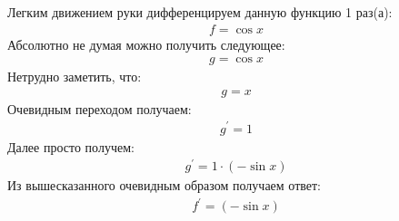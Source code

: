 \documentclass[12pt,a4paper]{scrartcl}
\begin{document}
Легким движением руки дифференцируем данную функцию 1 раз(а):
\begin{gather}\label{eq:1}f  =  \cos{ x } \end{gather}
Абсолютно не думая можно получить следующее:
\begin{gather}\label{eq:1}g  =  \cos{ x } \end{gather}
Нетрудно заметить, что:
\begin{gather}\label{eq:1}g  = x\end{gather}
Очевидным переходом получаем:
\begin{gather}\label{eq:1}g^\prime  = 1\end{gather}
Далее просто получем:
\begin{gather}\label{eq:1}g^\prime  = 1 \cdot  \left(- \sin{ x } \right) \end{gather}
Из вышесказанного очевидным образом получаем ответ:
\begin{gather}\label{eq:1}f^\prime  =  \left(- \sin{ x } \right) \end{gather}
\end{document}
